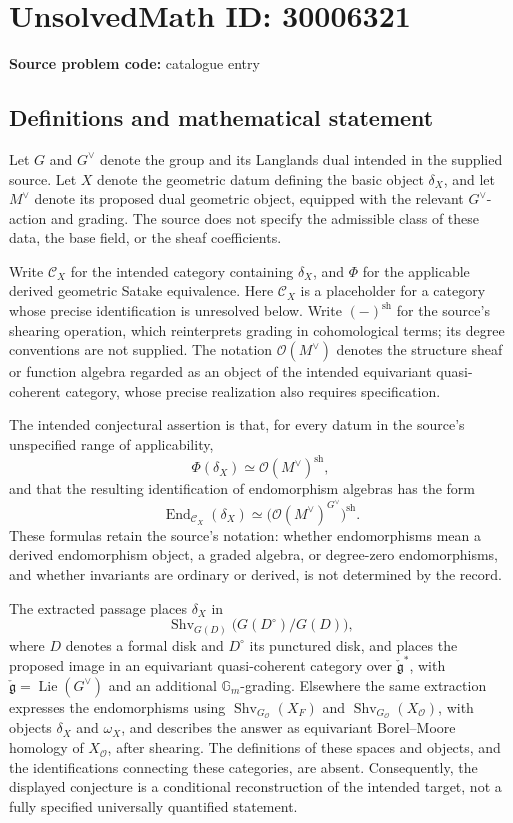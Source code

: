 \documentclass[11pt]{article}
\begin{document}
\section*{UnsolvedMath ID: 30006321}
\textbf{Source problem code:} catalogue entry
\subsection{Definitions and mathematical statement}
Let \(G\) and \(G^\vee\) denote the group and its Langlands dual intended in the supplied source. Let \(X\) denote the geometric datum defining the basic object \(\delta_X\), and let \(M^\vee\) denote its proposed dual geometric object, equipped with the relevant \(G^\vee\)-action and grading. The source does not specify the admissible class of these data, the base field, or the sheaf coefficients.

Write \(\mathcal C_X\) for the intended category containing \(\delta_X\), and \(\Phi\) for the applicable derived geometric Satake equivalence. Here \(\mathcal C_X\) is a placeholder for a category whose precise identification is unresolved below. Write \((-)^{\mathrm{sh}}\) for the source's shearing operation, which reinterprets grading in cohomological terms; its degree conventions are not supplied. The notation \(\mathcal O(M^\vee)\) denotes the structure sheaf or function algebra regarded as an object of the intended equivariant quasi-coherent category, whose precise realization also requires specification.

The intended conjectural assertion is that, for every datum in the source's unspecified range of applicability,
\[
\Phi(\delta_X)\simeq \mathcal O(M^\vee)^{\mathrm{sh}},
\]
and that the resulting identification of endomorphism algebras has the form
\[
\operatorname{End}_{\mathcal C_X}(\delta_X)
\simeq
\bigl(\mathcal O(M^\vee)^{G^\vee}\bigr)^{\mathrm{sh}}.
\]
These formulas retain the source's notation: whether endomorphisms mean a derived endomorphism object, a graded algebra, or degree-zero endomorphisms, and whether invariants are ordinary or derived, is not determined by the record.

The extracted passage places \(\delta_X\) in
\[
\operatorname{Shv}_{G(D)}\bigl(G(D^\circ)/G(D)\bigr),
\]
where \(D\) denotes a formal disk and \(D^\circ\) its punctured disk, and places the proposed image in an equivariant quasi-coherent category over \(\check{\mathfrak g}^{*}\), with \(\check{\mathfrak g}=\operatorname{Lie}(G^\vee)\) and an additional \(\mathbb G_m\)-grading. Elsewhere the same extraction expresses the endomorphisms using \(\operatorname{Shv}_{G_{\mathcal O}}(X_F)\) and \(\operatorname{Shv}_{G_{\mathcal O}}(X_{\mathcal O})\), with objects \(\delta_X\) and \(\omega_X\), and describes the answer as equivariant Borel--Moore homology of \(X_{\mathcal O}\), after shearing. The definitions of these spaces and objects, and the identifications connecting these categories, are absent. Consequently, the displayed conjecture is a conditional reconstruction of the intended target, not a fully specified universally quantified statement.
\end{document}

